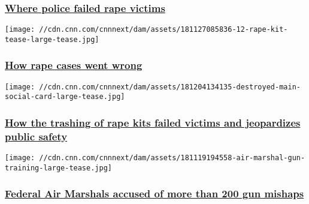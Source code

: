 \hypertarget{where-police-failed-rape-victims}{%
\subsubsection{\texorpdfstring{\href{https://www.cnn.com/interactive/2018/11/investigates/police-destroyed-rapekits/springfield.html}{Where
police failed rape
victims}}{Where police failed rape victims}}\label{where-police-failed-rape-victims}}

\href{https://www.cnn.com/interactive/2018/11/investigates/police-destroyed-rapekits/case-files.html}{}

\texttt{[image: //cdn.cnn.com/cnnnext/dam/assets/181127085836-12-rape-kit-tease-large-tease.jpg]}

\hypertarget{how-rape-cases-went-wrong}{%
\subsubsection{\texorpdfstring{\href{https://www.cnn.com/interactive/2018/11/investigates/police-destroyed-rapekits/case-files.html}{How
rape cases went
wrong}}{How rape cases went wrong}}\label{how-rape-cases-went-wrong}}

\href{https://www.cnn.com/destroyed}{}

\texttt{[image: //cdn.cnn.com/cnnnext/dam/assets/181204134135-destroyed-main-social-card-large-tease.jpg]}

\hypertarget{how-the-trashing-of-rape-kits-failed-victims-and-jeopardizes-public-safety-1}{%
\subsubsection{\texorpdfstring{\href{https://www.cnn.com/destroyed}{How
the trashing of rape kits failed victims and jeopardizes public
safety}}{How the trashing of rape kits failed victims and jeopardizes public safety}}\label{how-the-trashing-of-rape-kits-failed-victims-and-jeopardizes-public-safety-1}}

\href{/2018/11/19/us/air-marshal-guns-invs/index.html}{}

\texttt{[image: //cdn.cnn.com/cnnnext/dam/assets/181119194558-air-marshal-gun-training-large-tease.jpg]}

\hypertarget{federal-air-marshals-accused-of-more-than-200-gun-mishaps-1}{%
\subsubsection{\texorpdfstring{\href{/2018/11/19/us/air-marshal-guns-invs/index.html}{Federal
Air Marshals accused of more than 200 gun
mishaps}}{Federal Air Marshals accused of more than 200 gun mishaps}}\label{federal-air-marshals-accused-of-more-than-200-gun-mishaps-1}}

